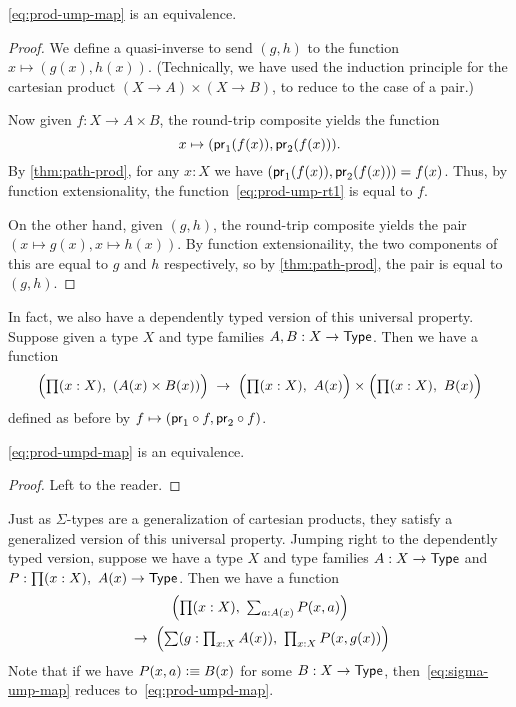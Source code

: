 \begin{thm}\label{thm:prod-ump}
  \eqref{eq:prod-ump-map} is an equivalence.
\end{thm}
\begin{proof}
  We define a quasi-inverse to send $(g,h)$ to the function $x\mapsto (g(x),h(x))$.
  (Technically, we have used the induction principle for the cartesian product $(X\to A)\times (X\to B)$, to reduce to the case of a pair.)

  Now given $f:X\to A\times B$, the round-trip composite yields the function
  \begin{equation}
    x\mapsto (\mathsf{pr}_{1}(f(x)),\mathsf{pr}_{2}(f(x))).\label{eq:prod-ump-rt1}
  \end{equation}
  By \autoref{thm:path-prod}, for any $x:X$ we have $(\mathsf{pr}_{1}(f(x)),\mathsf{pr}_{2}(f(x))) = f(x)$.
  Thus, by function extensionality, the function~\eqref{eq:prod-ump-rt1} is equal to $f$.

  On the other hand, given $(g,h)$, the round-trip composite yields the pair $(x\mapsto g(x),x\mapsto h(x))$.
  By function extensionaility, the two components of this are equal to $g$ and $h$ respectively, so by \autoref{thm:path-prod}, the pair is equal to $(g,h)$.
\end{proof}

In fact, we also have a dependently typed version of this universal property.
Suppose given a type $X$ and type families $A,B:X\to \mathsf{Type}$.
Then we have a function
\begin{equation}\label{eq:prod-umpd-map}
  \Big(\prd{x:X} (A(x)\times B(x))\Big) \;\to\; \Big(\prd{x:X} A(x)\Big) \times \Big(\prd{x:X} B(x)\Big)
\end{equation}
defined as before by $f \mapsto (\mathsf{pr}_{1} \circ f, \mathsf{pr}_{2}\circ f)$.

\begin{thm}\label{thm:prod-umpd}
  \eqref{eq:prod-umpd-map} is an equivalence.
\end{thm}
\begin{proof}
  Left to the reader.
\end{proof}

Just as $\Sigma$-types are a generalization of cartesian products, they satisfy a generalized version of this universal property.
Jumping right to the dependently typed version, suppose we have a type $X$ and type families $A:X\to \mathsf{Type}$ and $P:\prd{x:X} A(x)\to\type$.
Then we have a function
\begin{multline}
  \label{eq:sigma-ump-map}
  \Big(\prd{x:X} \textstyle\sum_{a:A(x)} P(x,a)\Big) \\ \;\to\;
  \Big(\sm{g:\textstyle\prod_{x:X} A(x)} \textstyle\prod_{x:X} P(x,g(x))\Big)
\end{multline}
Note that if we have $P(x,a) \vcentcolon\equiv B(x)$ for some $B:X\to\mathsf{Type}$, then~\eqref{eq:sigma-ump-map} reduces to~\eqref{eq:prod-umpd-map}.


